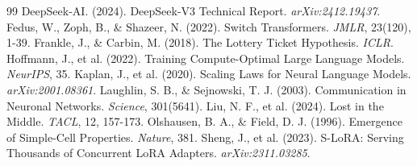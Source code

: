 \documentclass[11pt,a4paper]{article}
\begin{document}
\begin{thebibliography}{99}
 DeepSeek-AI. (2024). DeepSeek-V3 Technical Report. \textit{arXiv:2412.19437}.
 Fedus, W., Zoph, B., \& Shazeer, N. (2022). Switch Transformers. \textit{JMLR}, 23(120), 1-39.
 Frankle, J., \& Carbin, M. (2018). The Lottery Ticket Hypothesis. \textit{ICLR}.
 Hoffmann, J., et al. (2022). Training Compute-Optimal Large Language Models. \textit{NeurIPS}, 35.
 Kaplan, J., et al. (2020). Scaling Laws for Neural Language Models. \textit{arXiv:2001.08361}.
 Laughlin, S. B., \& Sejnowski, T. J. (2003). Communication in Neuronal Networks. \textit{Science}, 301(5641).
 Liu, N. F., et al. (2024). Lost in the Middle. \textit{TACL}, 12, 157-173.
 Olshausen, B. A., \& Field, D. J. (1996). Emergence of Simple-Cell Properties. \textit{Nature}, 381.
 Sheng, J., et al. (2023). S-LoRA: Serving Thousands of Concurrent LoRA Adapters. \textit{arXiv:2311.03285}.
\end{thebibliography}
\end{document}
